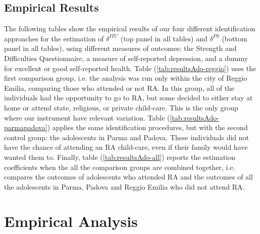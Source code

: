 \documentclass[12pt]{article}
\begin{document}
\doublespacing

\subsection{Empirical Results}
\label{sec:results}
The following tables show the empirical results of our four different identification approaches for the estimation of $\delta^{ITC}$ (top panel in all tables) and $\delta^{PS}$ (bottom panel in all tables), using different measures of outcomes: the Strength and Difficulties Questionnaire, a measure of self-reported depression, and a dummy for excellent or good self-reported health. 
Table (\ref{tab:resultsAdo-reggio}) uses the first comparison group, i.e. the analysis was run only within the city of Reggio Emilia, comparing those who attended or not RA. In this group, all of the individuals had the opportunity to go to RA, but some decided to either stay at home or attend state, religious, or private child-care. This is the only group where our instrument have relevant variation.
Table (\ref{tab:resultsAdo-parmapadova}) applies the same identification procedures, but with the second control group: the adolescents in Parma and Padova. These individuals did not have the chance of attending an RA child-care, even if their family would have wanted them to.
Finally, table (\ref{tab:resultsAdo-all}) reports the estimation coefficients when the all the comparison groups are combined together, i.e. compares the outcomes of adolescents who attended RA and the outcomes of all the adolescents in Parma, Padova and Reggio Emilia who did not attend RA.

\singlespacing
\setlength\tabcolsep{0.25em}





\pagebreak



\appendix
\section{Empirical Analysis}
\end{document}
